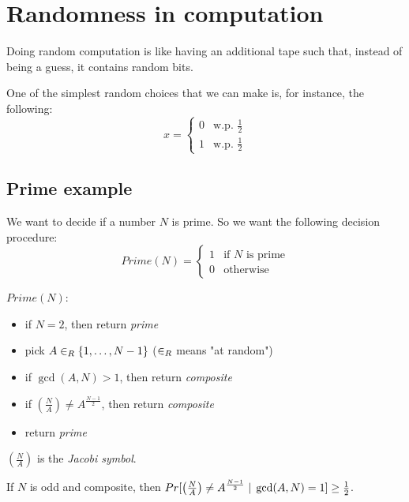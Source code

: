 \section{Randomness in computation}\label{sec:randomness}

Doing random computation is like having an additional tape such that, instead of being a guess, it contains random bits.

One of the simplest random choices that we can make is, for instance, the following:
\begin{equation}\label{eq:random_example}
    x = 
    \begin{cases}
        0 & \text{w.p. } \frac{1}{2}\\
        1 & \text{w.p. } \frac{1}{2}
    \end{cases}
\end{equation}


\subsection{Prime example}\label{subsec:random_prime}

    We want to decide if a number $N$ is prime.
    So we want the following decision procedure:
    \begin{equation}\label{eq:prime_random}
        Prime(N) = 
        \begin{cases}
            1 & \text{if } N \text{ is prime}\\
            0 & \text{otherwise}
        \end{cases}
    \end{equation}

    $Prime(N)$:
    \begin{itemize}
        \item if $N = 2$, then return \textit{prime}
        \item pick $A \in_R \{ 1, \dots, N-1 \}$ ($\in_R$ means "at random")
        \item if $\gcd(A,N) > 1$, then return \textit{composite}
        \item if $\left(\frac{N}{A}\right) \neq A^{\frac{N-1}{2}}$, then return \textit{composite}
        \item return \textit{prime}
    \end{itemize}

    $\left(\frac{N}{A}\right)$ is the \textit{Jacobi symbol}.

    If $N$ is odd and composite, then $Pr [ \left(\frac{N}{A}\right) \neq A^{\frac{N-1}{2}} \; \vert \; \gcd(A,N) = 1 ] \geq \frac{1}{2}$.

